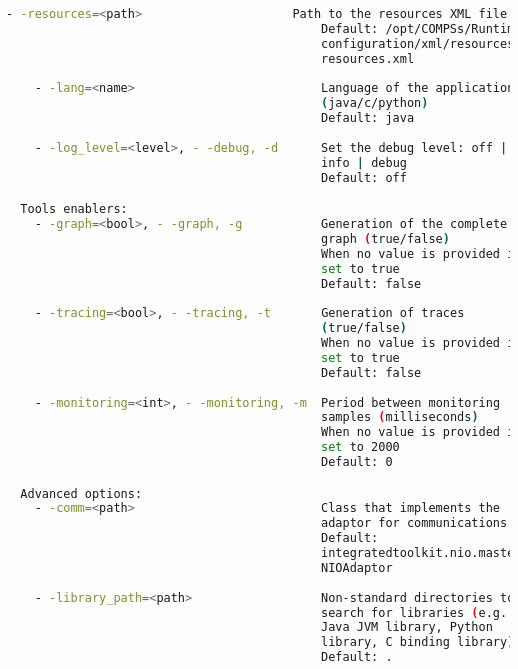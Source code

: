 \begin{lstlisting}[language=bash]
    - -resources=<path>                     Path to the resources XML file
                                            Default: /opt/COMPSs/Runtime/
                                            configuration/xml/resources/
                                            resources.xml
                                            
    - -lang=<name>                          Language of the application
                                            (java/c/python)
                                            Default: java
                                            
    - -log_level=<level>, - -debug, -d      Set the debug level: off | 
                                            info | debug
                                            Default: off

  Tools enablers:
    - -graph=<bool>, - -graph, -g           Generation of the complete
                                            graph (true/false)
                                            When no value is provided it is 
                                            set to true
                                            Default: false
                                            
    - -tracing=<bool>, - -tracing, -t       Generation of traces 
                                            (true/false)
                                            When no value is provided it is 
                                            set to true
                                            Default: false
                                            
    - -monitoring=<int>, - -monitoring, -m  Period between monitoring 
                                            samples (milliseconds)
                                            When no value is provided it is
                                            set to 2000
                                            Default: 0

  Advanced options:
    - -comm=<path>                          Class that implements the 
                                            adaptor for communications
                                            Default: 
                                            integratedtoolkit.nio.master.
                                            NIOAdaptor
                                            
    - -library_path=<path>                  Non-standard directories to 
                                            search for libraries (e.g. 
                                            Java JVM library, Python 
                                            library, C binding library) 
                                            Default: .
                                            

\end{lstlisting}

